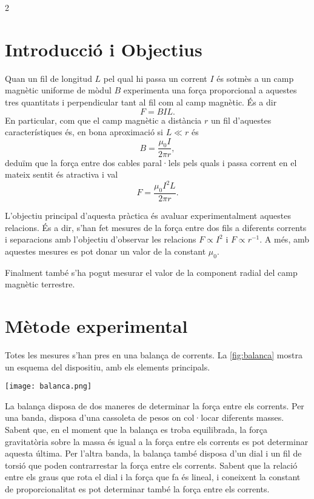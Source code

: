 \begin{multicols*}{2}
	\section{Introducció i Objectius}
	Quan un fil de longitud \( L \) pel qual hi passa un corrent \( I \) és sotmès a un camp magnètic uniforme de mòdul \( B \) experimenta una força proporcional a aquestes tres quantitats i perpendicular tant al fil com al camp magnètic. És a dir
	\begin{equation} \label{eq:forca magnetica} 
		F = BIL.
	\end{equation}
	En particular, com que el camp magnètic a distància \( r \) un fil d'aquestes característiques és, en bona aproximació si \( L \ll r \) és
	\begin{equation*}
		B = \frac{\mu_0 I}{2\pi r},
	\end{equation*}
	deduïm que la força entre dos cables paral·lels pels quals i passa corrent en el mateix sentit és atractiva i val
	\begin{equation} \label{eq:forca i corrent}
		F = \frac{\mu_0I^2L}{2\pi r}.
	\end{equation}

	L'objectiu principal d'aquesta pràctica és avaluar experimentalment aquestes relacions. És a dir, s'han fet mesures de la força entre dos fils a diferents corrents i separacions amb l'objectiu d'observar les relacions \( F \propto I^2 \) i \( F \propto r^{-1} \). A més, amb aquestes mesures es pot donar un valor de la constant \( \mu_0 \).  

	Finalment també s'ha pogut mesurar el valor de la component radial del camp magnètic terrestre. 

	\section{Mètode experimental}
	Totes les mesures s'han pres en una balança de corrents. La \cref{fig:balanca} mostra un esquema del dispositiu, amb els elements principals.
	\begin{figure*}
		\centering
		\texttt{[image: balanca.png]}
		\caption{Esquema de la balança de corrents amb els principals elements}
		\label{fig:balanca}
	\end{figure*}

	La balança disposa de dos maneres de determinar la força entre els corrents. Per una banda, disposa d'una cassoleta de pesos on col·locar diferents masses. Sabent que, en el moment que la balança es troba equilibrada, la força gravitatòria sobre la massa és igual a la força entre els corrents es pot determinar aquesta última. Per l'altra banda, la balança també disposa d'un dial i un fil de torsió que poden contrarrestar la força entre els corrents. Sabent que la relació entre els graus que rota el dial i la força que fa és lineal, i coneixent la constant de proporcionalitat es pot determinar també la força entre els corrents.


\end{multicols*}
